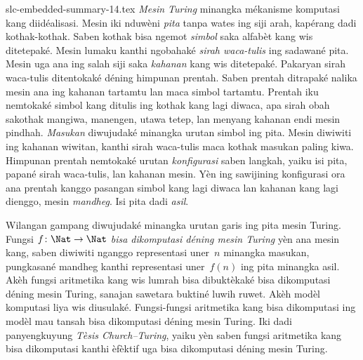 \begin{filecontents*}[overwrite]{slc-embedded-summary-14.tex}
\emph{Mesin Turing} minangka mékanisme komputasi kang
diidéalisasi. Mesin iki nduwèni \emph{pita} tanpa wates ing
siji arah, kapérang dadi kothak-kothak. Saben kothak bisa ngemot
\emph{simbol} saka alfabèt kang wis ditetepaké. Mesin lumaku
kanthi ngobahaké \emph{sirah waca-tulis} ing sadawané pita.
Mesin uga ana ing salah siji saka \emph{kahanan} kang wis
ditetepaké. Pakaryan sirah waca-tulis ditentokaké déning
himpunan prentah. Saben prentah ditrapaké nalika mesin ana
ing kahanan tartamtu lan maca simbol tartamtu. Prentah iku
nemtokaké simbol kang ditulis ing kothak kang lagi diwaca,
apa sirah obah sakothak mangiwa, manengen, utawa tetep, lan
menyang kahanan endi mesin pindhah. \emph{Masukan} diwujudaké
minangka urutan simbol ing pita. Mesin diwiwiti ing kahanan
wiwitan, kanthi sirah waca-tulis maca kothak masukan paling
kiwa. Himpunan prentah nemtokaké urutan \emph{konfigurasi}
saben langkah, yaiku isi pita, papané sirah waca-tulis, lan
kahanan mesin. Yèn ing sawijining konfigurasi ora ana
prentah kanggo pasangan simbol kang lagi diwaca lan kahanan
kang lagi dienggo, mesin \emph{mandheg}. Isi pita dadi
\emph{asil}.

Wilangan gampang diwujudaké minangka urutan garis ing pita
mesin Turing. Fungsi $f\colon\Nat\to\Nat$ \emph{bisa
dikomputasi déning mesin Turing} yèn ana mesin kang, saben
diwiwiti nganggo representasi uner~$n$ minangka masukan,
pungkasané mandheg kanthi representasi uner~$f(n)$ ing pita
minangka asil. Akèh fungsi aritmetika kang wis lumrah bisa
dibuktèkaké bisa dikomputasi déning mesin Turing, sanajan
sawetara buktiné luwih ruwet. Akèh modèl komputasi liya wis
diusulaké. Fungsi-fungsi aritmetika kang bisa dikomputasi ing
modèl mau tansah bisa dikomputasi déning mesin Turing.
Iki dadi panyengkuyung \emph{Tèsis Church--Turing}, yaiku yèn
saben fungsi aritmetika kang bisa dikomputasi kanthi èfèktif
uga bisa dikomputasi déning mesin Turing.
\end{filecontents*}

